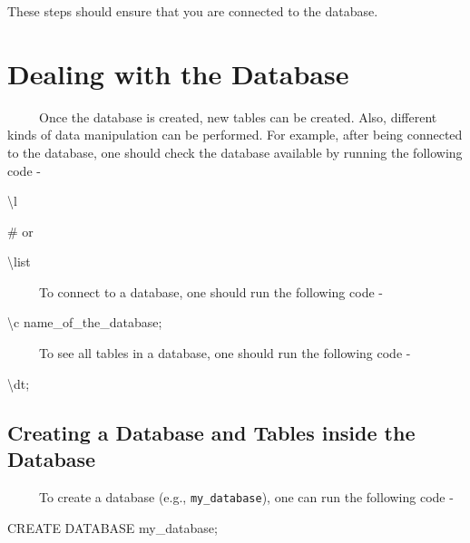 \documentclass[
  letterpaper,
  DIV=11,
  numbers=noendperiod]{scrreprt}
\newenvironment{Shaded}{\begin{snugshade}}{\end{snugshade}}
\newcommand{\CommentTok}[1]{\textcolor[rgb]{0.37,0.37,0.37}{#1}}
\newcommand{\NormalTok}[1]{\textcolor[rgb]{0.00,0.23,0.31}{#1}}
\begin{document}
These steps should ensure that you are connected to the database.

\section{Dealing with the Database}\label{sec-dealdatabase}

~~~~~Once the database is created, new tables can be created. Also,
different kinds of data manipulation can be performed. For example,
after being connected to the database, one should check the database
available by running the following code -

\begin{Shaded}
\begin{Highlighting}[]
\NormalTok{\textbackslash{}l }

\CommentTok{\# or }

\NormalTok{\textbackslash{}list}
\end{Highlighting}
\end{Shaded}

~~~~~To connect to a database, one should run the following code -

\begin{Shaded}
\begin{Highlighting}[]
\NormalTok{\textbackslash{}c name\_of\_the\_database;}
\end{Highlighting}
\end{Shaded}

~~~~~To see all tables in a database, one should run the following code
-

\begin{Shaded}
\begin{Highlighting}[]
\NormalTok{\textbackslash{}dt;}
\end{Highlighting}
\end{Shaded}

\subsection{Creating a Database and Tables inside the
Database}\label{sec-creatingdatabase}

~~~~~To create a database (e.g., \texttt{my\_database}), one can run the
following code -

\begin{Shaded}
\begin{Highlighting}[]
\NormalTok{CREATE DATABASE my\_database;}
\end{Highlighting}
\end{Shaded}
\end{document}
